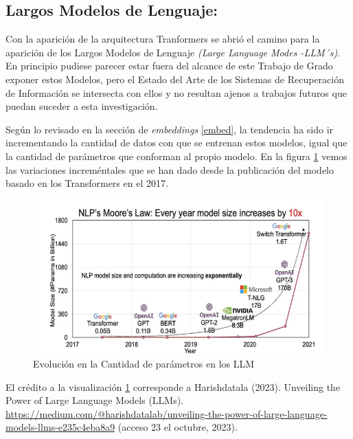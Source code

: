 \documentclass[
  12pt,
  openany]{book}
\begin{document}
\hypertarget{LLM}{%
\subsection{Largos Modelos de Lenguaje:}\label{LLM}}

Con la aparición de la arquitectura Tranformers se abrió el camino para la aparición de los Largos Modelos de Lenguaje \emph{(Large Language Modes -LLM´s)}. En principio pudiese parecer estar fuera del alcance de este Trabajo de Grado exponer estos Modelos, pero el Estado del Arte de los Sistemas de Recuperación de Información se intersecta con ellos y no resultan ajenos a trabajos futuros que puedan suceder a esta investigación.

Según lo revisado en la sección de \emph{embeddings} \ref{embed}, la tendencia ha sido ir incrementando la cantidad de datos con que se entrenan estos modelos, igual que la cantidad de parámetros que conforman al propio modelo. En la figura \ref{fig:llm} vemos las variaciones increméntales que se han dado desde la publicación del modelo basado en los Transformers en el 2017.

\begin{figure}

{\centering \includegraphics[width=0.85\linewidth]{images/03-marco-teorico/llms} 

}

\caption{Evolución en la Cantidad de parámetros en los LLM}\label{fig:llm}
\end{figure}

El crédito a la visualización \ref{fig:llm} corresponde a Harishdatala (2023). Unveiling the Power of Large Language Models (LLMs). \url{https://medium.com/@harishdatalab/unveiling-the-power-of-large-language-models-llms-e235c4eba8a9} (acceso 23 el octubre, 2023).
\end{document}
